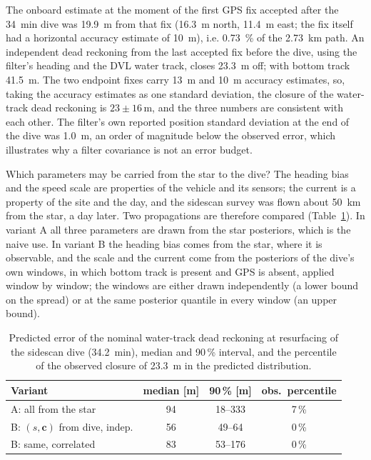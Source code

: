 \documentclass[conference]{IEEEtran}
\newcommand{\vect}[1]{\boldsymbol{#1}}
\begin{document}
The onboard estimate at the moment of the first GPS fix accepted after the \SI{34}{\minute} dive was \SI{19.9}{\meter} from that fix (\SI{16.3}{\meter} north, \SI{11.4}{\meter} east; the fix itself had a horizontal accuracy estimate of \SI{10}{\meter}), i.e. \SI{0.73}{\percent} of the \SI{2.73}{\kilo\meter} path. An independent dead reckoning from the last accepted fix before the dive, using the filter's heading and the DVL water track, closes \SI{23.3}{\meter} off; with bottom track \SI{41.5}{\meter}. The two endpoint fixes carry \SI{13}{\meter} and \SI{10}{\meter} accuracy estimates, so, taking the accuracy estimates as one standard deviation, the closure of the water-track dead reckoning is $23 \pm 16$\,m, and the three numbers are consistent with each other. The filter's own reported position standard deviation at the end of the dive was \SI{1.0}{\meter}, an order of magnitude below the observed error, which illustrates why a filter covariance is not an error budget.

Which parameters may be carried from the star to the dive? The heading bias and the speed scale are properties of the vehicle and its sensors; the current is a property of the site and the day, and the sidescan survey was flown about \SI{50}{\kilo\meter} from the star, a day later. Two propagations are therefore compared (Table~\ref{tab:prop}). In variant A all three parameters are drawn from the star posteriors, which is the naive use. In variant B the heading bias comes from the star, where it is observable, and the scale and the current come from the posteriors of the dive's own windows, in which bottom track is present and GPS is absent, applied window by window; the windows are either drawn independently (a lower bound on the spread) or at the same posterior quantile in every window (an upper bound).

\begin{table}[t]
\caption{Predicted error of the nominal water-track dead reckoning at resurfacing of the sidescan dive (\SI{34.2}{\minute}), median and 90\,\% interval, and the percentile of the observed closure of \SI{23.3}{\meter} in the predicted distribution.}
\label{tab:prop}
\centering
\footnotesize
\begin{tabular}{@{}lccc@{}}
\toprule
Variant & median [m] & 90\,\% [m] & obs.\ percentile \\
\midrule
A: all from the star & 94 & 18--333 & 7\,\% \\
B: $(s,\vect{c})$ from dive, indep. & 56 & 49--64 & 0\,\% \\
B: same, correlated & 83 & 53--176 & 0\,\% \\
\bottomrule
\end{tabular}
\end{table}
\end{document}
